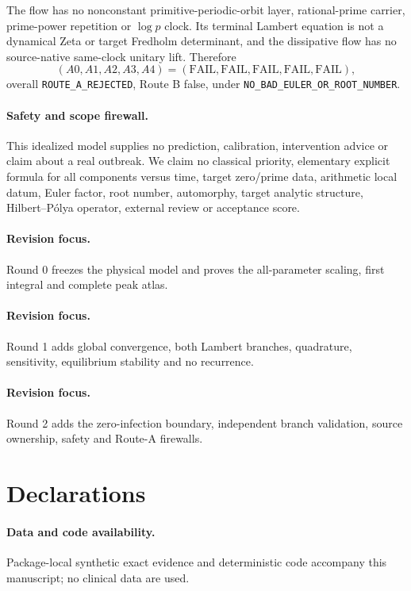 \documentclass[9pt]{extarticle}
\begin{document}
The flow has no nonconstant primitive-periodic-orbit layer, rational-prime
carrier, prime-power repetition or $\log p$ clock.  Its terminal Lambert
equation is not a dynamical Zeta or target Fredholm determinant, and the
dissipative flow has no source-native same-clock unitary lift.  Therefore
\[
 (A0,A1,A2,A3,A4)=(\mathrm{FAIL},\mathrm{FAIL},\mathrm{FAIL},
 \mathrm{FAIL},\mathrm{FAIL}),
\]
overall \texttt{ROUTE\_A\_REJECTED}, Route B false, under
\texttt{NO\_BAD\_EULER\_OR\_ROOT\_NUMBER}.

\paragraph{Safety and scope firewall.}
This idealized model supplies no prediction, calibration, intervention advice
or claim about a real outbreak.  We claim no classical priority, elementary
explicit formula for all components versus time, target zero/prime data,
arithmetic local datum, Euler factor, root number, automorphy, target analytic
structure, Hilbert--P\'olya operator, external review or acceptance score.
\fi

\ifcase\CRevisionRound
\paragraph{Revision focus.} Round 0 freezes the physical model and proves the
all-parameter scaling, first integral and complete peak atlas.
\or
\paragraph{Revision focus.} Round 1 adds global convergence, both Lambert
branches, quadrature, sensitivity, equilibrium stability and no recurrence.
\or
\paragraph{Revision focus.} Round 2 adds the zero-infection boundary,
independent branch validation, source ownership, safety and Route-A firewalls.
\fi

\section*{Declarations}
\paragraph{Data and code availability.} Package-local synthetic exact evidence
and deterministic code accompany this manuscript; no clinical data are used.
\end{document}
